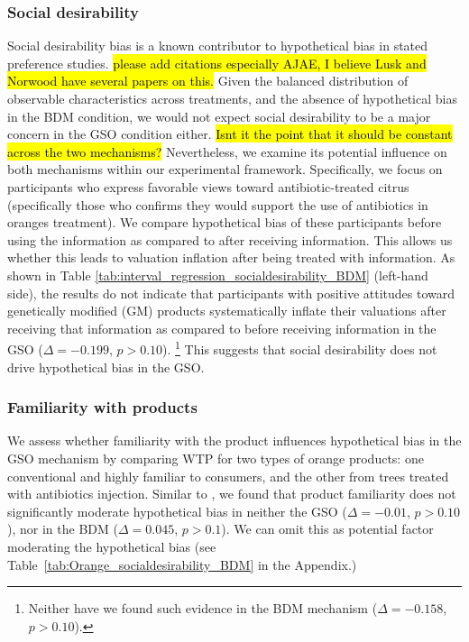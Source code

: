 \documentclass[12pt]{article}
\begin{document}
\subsubsection{Social desirability}
Social desirability bias is a known contributor to hypothetical bias in stated preference studies. \hl{please add citations especially AJAE, I believe Lusk and Norwood have several papers on this.} Given the balanced distribution of observable characteristics across treatments, and the absence of hypothetical bias in the BDM condition, we would not expect social desirability to be a major concern in the GSO condition either. \hl{Isnt it the point that it should be constant across the two mechanisms?} Nevertheless, we examine its potential influence on both mechanisms within our experimental framework. Specifically, we focus on participants who express favorable views toward antibiotic-treated citrus (specifically those who confirms they would support the use of antibiotics in oranges treatment).  We compare hypothetical bias of these participants before using the information as compared to after receiving information. This allows us whether this leads to valuation inflation after being treated with information. As shown in Table \ref{tab:interval_regression_socialdesirability_BDM} (left-hand side), the results do not indicate that participants with positive attitudes toward genetically modified (GM) products systematically inflate their valuations after receiving that information as compared to before receiving information in the GSO (\(\Delta = -0.199\), \(p > 0.10\)). \footnote{Neither have we found such evidence in the BDM mechanism (\(\Delta = -0.158\), \(p > 0.10\)).} This suggests that social desirability does not drive hypothetical bias in the GSO.

\subsubsection{Familiarity with products}
We assess whether familiarity with the product influences hypothetical bias in the GSO mechanism by comparing WTP for two types of orange products: one conventional and highly familiar to consumers, and the other from trees treated with antibiotics injection. Similar to \citet{veettil_hypothetical_2024},  we found that product familiarity does not significantly moderate hypothetical bias in neither the GSO (\(\Delta = -0.01\), \(p > 0.10\)), nor in the BDM (\(\Delta = 0.045\), \(p >0.1\)). We can omit this as potential factor moderating the hypothetical bias (see Table~\ref{tab:Orange_socialdesirability_BDM} in the Appendix.)
\end{document}
